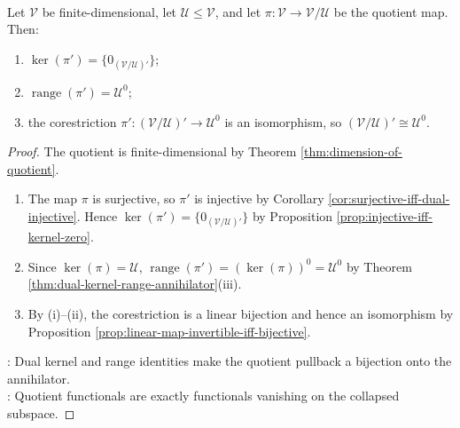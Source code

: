 \begin{corollary} \label{cor:quotient-dual-annihilator-isomorphism} \\
Let $\mathcal{V}$ be finite-dimensional, let $\mathcal{U}\leq\mathcal{V}$, and let $\pi:\mathcal{V}\to\mathcal{V}/\mathcal{U}$ be the quotient map. Then:
\begin{enumerate}[label=(\roman*)]
\setlength{\itemsep}{0pt}
\item $\ker(\pi')=\{0_{(\mathcal{V}/\mathcal{U})'}\}$;
\item $\operatorname{range}(\pi')=\mathcal{U}^0$;
\item the corestriction $\pi':(\mathcal{V}/\mathcal{U})'\to\mathcal{U}^0$ is an isomorphism, so $(\mathcal{V}/\mathcal{U})'\cong\mathcal{U}^0$.
\end{enumerate}
\begin{proof}
The quotient is finite-dimensional by Theorem \ref{thm:dimension-of-quotient}.
\begin{enumerate}[label=(\roman*)]
\setlength{\itemsep}{0pt}
\item The map $\pi$ is surjective, so $\pi'$ is injective by Corollary \ref{cor:surjective-iff-dual-injective}. Hence $\ker(\pi')=\{0_{(\mathcal{V}/\mathcal{U})'}\}$ by Proposition \ref{prop:injective-iff-kernel-zero}.
\item Since $\ker(\pi)=\mathcal{U}$, $\operatorname{range}(\pi')=(\ker(\pi))^0=\mathcal{U}^0$ by Theorem \ref{thm:dual-kernel-range-annihilator}(iii).
\item By (i)--(ii), the corestriction is a linear bijection and hence an isomorphism by Proposition \ref{prop:linear-map-invertible-iff-bijective}.
\end{enumerate}
: Dual kernel and range identities make the quotient pullback a bijection onto the annihilator.\\
: Quotient functionals are exactly functionals vanishing on the collapsed subspace.
\end{proof}
\end{corollary}

